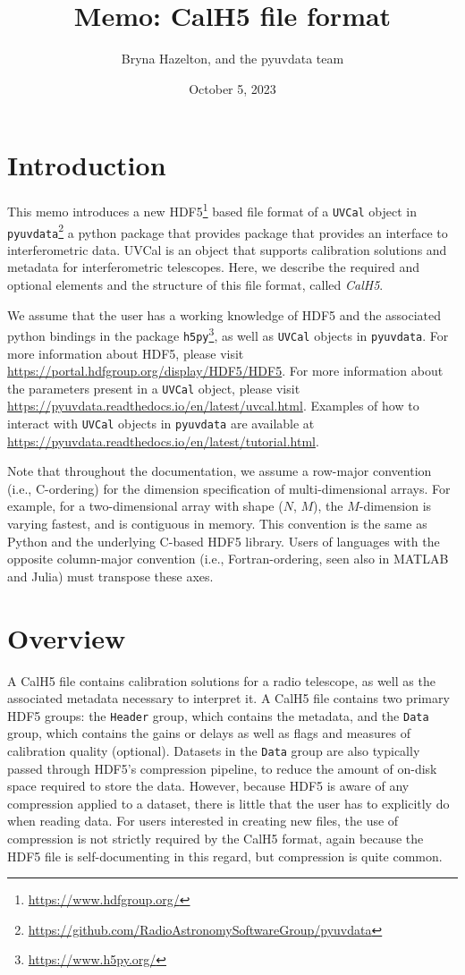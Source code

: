 \documentclass[11pt, oneside]{article}
\title{Memo: CalH5 file format}
\author{Bryna Hazelton, and the pyuvdata team}
\date{October 5, 2023}
\begin{document}
\maketitle
\section{Introduction}
\label{sec:intro}

This memo introduces a new HDF5\footnote{\url{https://www.hdfgroup.org/}} based
file format of a \texttt{UVCal} object in
\texttt{pyuvdata}\footnote{\url{https://github.com/RadioAstronomySoftwareGroup/pyuvdata}}
a python package that provides package that provides an interface to interferometric data.
UVCal is an object that supports calibration solutions and metadata for interferometric telescopes.
Here, we describe the required and optional elements and the structure of this file format, called
\textit{CalH5}.

We assume that the user has a working knowledge of HDF5 and the associated
python bindings in the package \texttt{h5py}\footnote{\url{https://www.h5py.org/}}, as
well as \texttt{UVCal} objects in \texttt{pyuvdata}. For more information about
HDF5, please visit \url{https://portal.hdfgroup.org/display/HDF5/HDF5}. For more
information about the parameters present in a \texttt{UVCal} object, please visit
\url{https://pyuvdata.readthedocs.io/en/latest/uvcal.html}.
Examples of how to interact with \texttt{UVCal} objects in \texttt{pyuvdata} are
available at \url{https://pyuvdata.readthedocs.io/en/latest/tutorial.html}.

Note that throughout the documentation, we assume a row-major convention (i.e.,
C-ordering) for the dimension specification of multi-dimensional arrays. For
example, for a two-dimensional array with shape ($N$, $M$), the $M$-dimension is
varying fastest, and is contiguous in memory. This convention is the same as
Python and the underlying C-based HDF5 library. Users of languages with the
opposite column-major convention (i.e., Fortran-ordering, seen also in MATLAB
and Julia) must transpose these axes.

\section{Overview}
\label{sec:overview}
A CalH5 file contains calibration solutions for a radio telescope, as well
as the associated metadata necessary to interpret it. A CalH5 file contains two
primary HDF5 groups: the \texttt{Header} group, which contains the metadata, and
the \texttt{Data} group, which contains the gains or delays as well as flags and
measures of calibration quality (optional). Datasets in the \texttt{Data} group are
also typically passed through HDF5's compression pipeline, to reduce the amount
of on-disk space required to store the data. However, because HDF5 is aware of
any compression applied to a dataset, there is little that the user has to explicitly
do when reading data. For users interested in creating new files, the use of
compression is not strictly required by the CalH5 format, again because the
HDF5 file is self-documenting in this regard, but compression is quite common.
\end{document}
